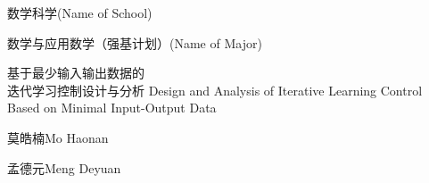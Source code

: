 
\school
{数学科学}{(Name of School)}

\major
{数学与应用数学（强基计划）}{(Name of Major)}

\thesistitle
{基于最少输入输出数据的\\迭代学习控制设计与分析}
{}
{Design and Analysis of Iterative Learning Control\\Based on Minimal Input-Output Data}
{}

\thesisauthor
{莫皓楠}{Mo Haonan}

\teacher
{孟德元}{Meng Deyuan}







